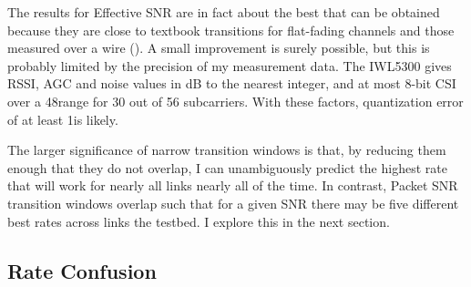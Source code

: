 The results for Effective SNR are in fact about the best that can be obtained because they are close to textbook transitions for flat-fading channels and those measured over a wire (). A small improvement is surely possible, but this is probably limited by the precision of my measurement data. The IWL5300 gives RSSI, AGC and noise values in dB to the nearest integer, and at most 8-bit CSI over a 48\dB range for 30 out of 56 subcarriers. With these factors, quantization error of at least 1\dB is likely.

The larger significance of narrow transition windows is that, by reducing them enough that they do not overlap, I can unambiguously predict the highest rate that will work for nearly all links nearly all of the time. In contrast, Packet SNR transition windows overlap such that for a given SNR there may be five different best rates across links the testbed. I explore this in the next section.


\subsection{Rate Confusion}

